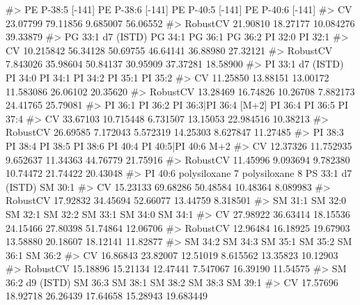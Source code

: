 \documentclass[
  letterpaper,
  DIV=11,
  numbers=noendperiod]{scrreprt}
\newenvironment{Shaded}{\begin{snugshade}}{\end{snugshade}}
\newcommand{\CommentTok}[1]{\textcolor[rgb]{0.37,0.37,0.37}{#1}}
\begin{document}
\begin{Shaded}
\begin{Highlighting}[]
\CommentTok{\#\textgreater{}          PE P{-}38:5 [{-}141] PE P{-}38:6 [{-}141] PE P{-}40:5 [{-}141] PE P{-}40:6 [{-}141]}
\CommentTok{\#\textgreater{} CV               23.07799         79.11856         9.685007         56.06552}
\CommentTok{\#\textgreater{} RobustCV         21.90810         18.27177        10.084276         39.33879}
\CommentTok{\#\textgreater{}          PG 33:1 d7 (ISTD)  PG 34:1  PG 36:1  PG 36:2  PI 32:0  PI 32:1}
\CommentTok{\#\textgreater{} CV               10.215842 56.34128 50.69755 46.64141 36.88980 27.32121}
\CommentTok{\#\textgreater{} RobustCV          7.843026 35.98604 50.84137 30.95909 37.37281 18.58900}
\CommentTok{\#\textgreater{}          PI 33:1 d7 (ISTD)  PI 34:0  PI 34:1   PI 34:2  PI 35:1  PI 35:2}
\CommentTok{\#\textgreater{} CV                11.25850 13.88151 13.00172 11.583086 26.06102 20.35620}
\CommentTok{\#\textgreater{} RobustCV          13.28469 16.74826 10.26708  7.882173 24.41765 25.79081}
\CommentTok{\#\textgreater{}           PI 36:1   PI 36:2 PI 36:3|PI 36:4 [M+2]  PI 36:4   PI 36:5  PI 37:4}
\CommentTok{\#\textgreater{} CV       33.67103 10.715448              6.731507 13.15053 22.984516 10.38213}
\CommentTok{\#\textgreater{} RobustCV 26.69585  7.172043              5.572319 14.25303  8.627847 11.27485}
\CommentTok{\#\textgreater{}           PI 38:3   PI 38:4  PI 38:5  PI 38:6  PI 40:4 PI 40:5|PI 40:6 M+2}
\CommentTok{\#\textgreater{} CV       12.37326 11.752935 9.652637 11.34363 44.76779            21.75916}
\CommentTok{\#\textgreater{} RobustCV 11.45996  9.093694 9.782380 10.74472 21.74422            20.43048}
\CommentTok{\#\textgreater{}           PI 40:6 polysiloxane 7 polysiloxane 8 PS 33:1 d7 (ISTD)  SM 30:1}
\CommentTok{\#\textgreater{} CV       15.23133       69.68286       50.48584          10.48364 8.089983}
\CommentTok{\#\textgreater{} RobustCV 17.92832       34.45694       52.66077          13.44759 8.318501}
\CommentTok{\#\textgreater{}           SM 31:1  SM 32:0  SM 32:1  SM 32:2  SM 33:1  SM 34:0  SM 34:1}
\CommentTok{\#\textgreater{} CV       27.98922 36.63414 18.15536 24.15466 27.80398 51.74864 12.06706}
\CommentTok{\#\textgreater{} RobustCV 12.96484 16.18925 19.67903 13.58880 20.18607 18.12141 11.82877}
\CommentTok{\#\textgreater{}           SM 34:2  SM 34:3  SM 35:1  SM 35:2  SM 36:1  SM 36:2}
\CommentTok{\#\textgreater{} CV       16.86843 23.82007 12.51019 8.615562 13.35823 10.12903}
\CommentTok{\#\textgreater{} RobustCV 15.18896 15.21134 12.47441 7.547067 16.39190 11.54575}
\CommentTok{\#\textgreater{}          SM 36:2 d9 (ISTD)  SM 36:3  SM 38:1  SM 38:2  SM 38:3   SM 39:1}
\CommentTok{\#\textgreater{} CV                17.57696 18.92718 26.26439 17.64658 15.28943 19.683449}

\end{Highlighting}
\end{Shaded}
\end{document}
